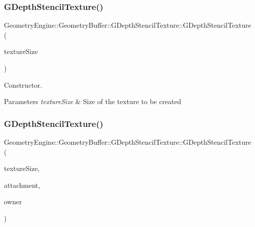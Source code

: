 \subsubsection{\texorpdfstring{GDepthStencilTexture()}{GDepthStencilTexture()}\hspace{0.1cm}{\footnotesize\ttfamily [1/3]}}
{\footnotesize\ttfamily Geometry\+Engine\+::\+Geometry\+Buffer\+::\+G\+Depth\+Stencil\+Texture\+::\+G\+Depth\+Stencil\+Texture (\begin{DoxyParamCaption}\item[{const Q\+Vector2D \&}]{texture\+Size }\end{DoxyParamCaption})}

Constructor. 
\begin{DoxyParams}{Parameters}
{\em texture\+Size} & Size of the texture to be created \\
\hline
\end{DoxyParams}
\mbox{\label{class_geometry_engine_1_1_geometry_buffer_1_1_g_depth_stencil_texture_a03bf1c5b969afa4dbf5a7c53b6c9a58a}} 
\subsubsection{\texorpdfstring{GDepthStencilTexture()}{GDepthStencilTexture()}\hspace{0.1cm}{\footnotesize\ttfamily [2/3]}}
{\footnotesize\ttfamily Geometry\+Engine\+::\+Geometry\+Buffer\+::\+G\+Depth\+Stencil\+Texture\+::\+G\+Depth\+Stencil\+Texture (\begin{DoxyParamCaption}\item[{const Q\+Vector2D \&}]{texture\+Size,  }\item[{G\+Framebuffer\+Commons\+::\+G\+\_\+\+D\+E\+P\+T\+H\+\_\+\+S\+T\+E\+N\+C\+I\+L\+\_\+\+A\+T\+T\+A\+C\+H\+M\+E\+N\+TS}]{attachment,  }\item[{const \mbox{\hyperlink{class_geometry_engine_1_1_geometry_buffer_1_1_g_framebuffer_object}{G\+Framebuffer\+Object}} $\ast$}]{owner }\end{DoxyParamCaption})}

